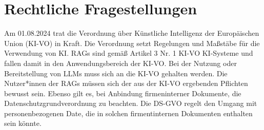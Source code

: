 

\section{Rechtliche Fragestellungen}

Am 01.08.2024 trat die Verordnung über Künstliche Intelligenz der Europäischen Union (KI-VO) in Kraft. Die Verordnung setzt Regelungen und Maßstäbe für die Verwendung von KI.
RAGs sind gemäß Artikel 3 Nr. 1 KI-VO KI-Systeme und fallen damit in den Anwendungsbereich der KI-VO.
Bei der Nutzung oder Bereitstellung von LLMs muss sich an die KI-VO gehalten werden. Die Nutzer*innen der RAGs müssen sich der aus der KI-VO ergebenden Pflichten bewusst sein.
Ebenso gilt es, bei Anbindung firmeninterner Dokumente, die Datenschutzgrundverordnung zu beachten. Die DS-GVO regelt den Umgang mit personenbezogenen Date, die in solchen firmentinternen Dokumenten enthalten sein könnte.